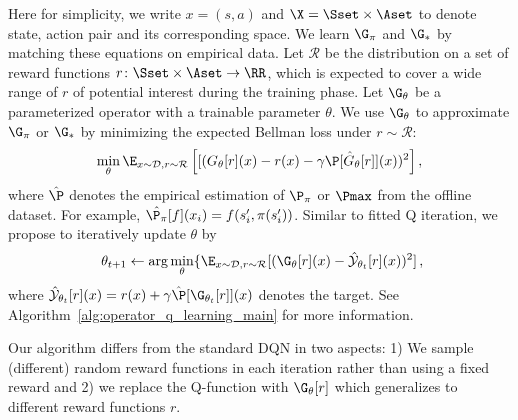 Here for simplicity, we write $x = (s,a)$ and $\X = \Sset \times \Aset$ to denote state, action pair and its corresponding space. 
We learn $\G_\pi$ and $\G_*$ by matching these equations on empirical data. 
Let 
$\mathcal R$ be the distribution 
on a set of reward functions $r\colon \Sset\times \Aset \to \RR$, 
which is expected to cover a wide range of $r$ of potential interest during the training phase.
Let $\G_\theta$ be a parameterized operator with a trainable parameter $\theta$. 
We use $\G_\theta$ to approximate $\G_\pi$ or $\G_*$ by minimizing the expected Bellman loss under $r\sim \mathcal R$: 
$$
\min_{\theta} \E_{x\sim \mathcal D,r\sim \mathcal R}  \left [ [(G_{\theta}[r](x) - r(x) - \gamma 
\hat \P[G_\theta[r]](x))^2 \right ],
$$
where $\hat \P$ denotes the empirical estimation of $\P_\pi$ or $\Pmax$ from the offline dataset. 
For example, $\hat{\P_\pi}[f](x_i) = f(s_i', \pi(s_i'))$.
Similar to fitted Q iteration, 
we propose to iteratively update $\theta$ by 
\begin{equation}\label{eqn:fitted_update}
    \theta_{t+1} \gets 
    \arg\min_{\theta}\{ 
    \E_{x\sim \mathcal D,r\sim \mathcal R} [(\G_\theta[r](x)  - \hat{\mathcal Y}_{\theta_t} [r](x) )^2]\,,\!\!
\end{equation}
where $\hat{\mathcal Y}_{\theta_t} [r](x)  = r(x) + \gamma 
\hat\P[\G_{\theta_t}[r]](x)$ denotes the target. 
See Algorithm~\ref{alg:operator_q_learning_main} for more information. %

Our algorithm differs from the standard DQN in two aspects:
1) We sample (different) random reward functions in each iteration rather than using a fixed reward and
2) we replace the Q-function with $\G_\theta[r]$   %
which generalizes to 
different reward functions $r$. 